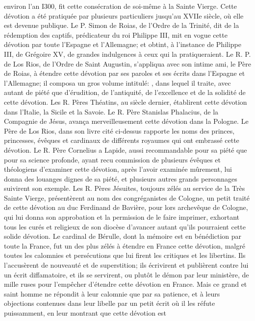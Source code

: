 environ l'an I300, fit cette consécration de soi-même à la Sainte Vierge. Cette dévotion a été pratiquée par
plusieurs particuliers jusqu'au XVIIe siècle, où elle est devenue publique.
 Le P. Simon de Roias, de l'Ordre de la Trinité, dit de la rédemption des captifs, prédicateur du roi Philippe III,
mit en vogue cette dévotion par toute l'Espagne et l'Allemagne; et obtint, à l'instance de Philippe III, de Grégoire
XV, de grandes indulgences à ceux qui la pratiqueraient.
Le R. P. de Los Rios, de l'Ordre de Saint Augustin, s'appliqua avec son intime ami, le Père de Roias, à étendre
cette dévotion par ses paroles et ses écrits dans l'Espagne et l'Allemagne; il composa un gros volume intitulé:
, dans lequel il traite, avec autant de piété que d'érudition, de l'antiquité, de l'excellence et de la
solidité de cette dévotion. Les R. Pères Théatins, au siècle dernier, établirent cette dévotion dans l'Italie, la Sicile et
la Savoie.
 Le R. Père Stanislas Phalacius, de la Compagnie de Jésus, avança merveilleusement cette dévotion dans la
Pologne.
Le Père de Los Rios, dans son livre cité ci-dessus rapporte les noms des princes, princesses, évêques et
cardinaux de différents royaumes qui ont embrassé cette dévotion. Le R. Père Cornelius a Lapide, aussi
recommandable pour sa piété que pour sa science profonde, ayant recu commission de plusieurs évêques et
théologiens d'examiner cette dévotion, après l'avoir examinée mûrement, lui donna des louanges dignes de sa
piété, et plusieurs autres grands personnages suivirent son exemple. Les R. Pères Jésuites, toujours zélés au
service de la Très Sainte Vierge, présentèrent au nom des congréganistes de Cologne, un petit traité de cette
dévotion au duc Ferdinand de Bavière, pour lors archevêque de Cologne, qui lui donna son approbation et la
permission de le faire imprimer, exhortant tous les curés et religieux de son diocèse d'avancer autant qu'ils
pourraient cette solide dévotion.
 Le cardinal de Bérulle, dont la mémoire est en bénédiction par toute la France, fut un des plus zélés à
étendre en France cette dévotion, malgré toutes les calomnies et persécutions que lui firent les critiques et les
libertins. Ils l'accusèrent de nouveauté et de superstition; ils écrivirent et publièrent contre lui un écrit diffamatoire,
et ils se servirent, ou plutôt le démon par leur ministère, de mille ruses pour l'empêcher d'étendre cette dévotion en
France. Mais ce grand et saint homme ne répondit à leur calomnie que par sa patience, et à leurs objections
contenues dans leur libelle par un petit écrit où il les réfute puissamment, en leur montrant que cette dévotion est
